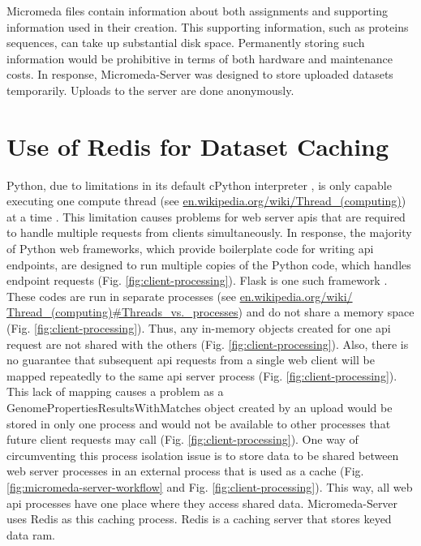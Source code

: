 Micromeda files contain information about both assignments and supporting 
information used in their creation. This supporting information, such as 
proteins sequences, can take up substantial disk space. Permanently storing such 
information would be prohibitive in terms of both hardware and maintenance 
costs. In response, Micromeda-Server was designed to store uploaded datasets 
temporarily. Uploads to the server are done anonymously. 

\section{Use of Redis for Dataset Caching} \label{redis-caching}

Python, due to limitations in its default cPython interpreter 
\cite{van1995python}, is only capable executing one compute thread 
\cite{saltzer1966traffic} (see 
\href{http://en.wikipedia.org/wiki/Thread_(computing)}{en.wikipedia.org/wiki/Thread\_(computing)}) 
at a time \cite{beazley2010understanding}. This limitation causes problems for 
web server \gls{api}s that are required to handle multiple requests from clients 
simultaneously. In response, the majority of Python web frameworks, which 
provide boilerplate code for writing \gls{api} endpoints, are designed to run 
multiple copies of the Python code, which handles endpoint requests (Fig. 
\ref{fig:client-processing}). Flask is one such framework 
\cite{grinberg2018flask}. These codes are run in separate processes (see 
\href{http://en.wikipedia.org/wiki/Thread_(computing)\#Threads\_vs.\_processes}{en.wikipedia.org/wiki/ 
Thread\_(computing)\#Threads\_vs.\_processes}) and do not share a memory space 
(Fig. \ref{fig:client-processing}). Thus, any in-memory objects created for one 
\gls{api} request are not shared with the others (Fig. 
\ref{fig:client-processing}). Also, there is no guarantee that subsequent 
\gls{api} requests from a single web client will be mapped repeatedly to the 
same \gls{api} server process (Fig. \ref{fig:client-processing}). This lack of 
mapping causes a problem as a GenomePropertiesResultsWithMatches object created 
by an upload would be stored in only one process and would not be available to 
other processes that future client requests may call (Fig. 
\ref{fig:client-processing}). One way of circumventing this process isolation 
issue is to store data to be shared between web server processes in an external 
process that is used as a cache (Fig. \ref{fig:micromeda-server-workflow} and 
Fig. \ref{fig:client-processing}). This way, all web \gls{api} processes have 
one place where they access shared data. Micromeda-Server uses Redis as this 
caching process. Redis is a caching server that stores keyed data \gls{ram}. 

